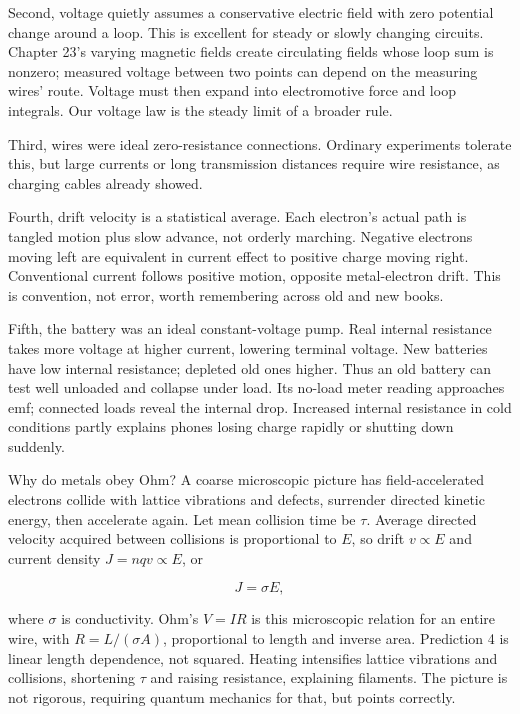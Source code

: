 Second, voltage quietly assumes a conservative electric field with zero potential change around a loop. This is excellent for steady or slowly changing circuits. Chapter 23's varying magnetic fields create circulating fields whose loop sum is nonzero; measured voltage between two points can depend on the measuring wires' route. Voltage must then expand into electromotive force and loop integrals. Our voltage law is the steady limit of a broader rule.

Third, wires were ideal zero-resistance connections. Ordinary experiments tolerate this, but large currents or long transmission distances require wire resistance, as charging cables already showed.

Fourth, drift velocity is a statistical average. Each electron's actual path is tangled motion plus slow advance, not orderly marching. Negative electrons moving left are equivalent in current effect to positive charge moving right. Conventional current follows positive motion, opposite metal-electron drift. This is convention, not error, worth remembering across old and new books.

Fifth, the battery was an ideal constant-voltage pump. Real internal resistance takes more voltage at higher current, lowering terminal voltage. New batteries have low internal resistance; depleted old ones higher. Thus an old battery can test well unloaded and collapse under load. Its no-load meter reading approaches emf; connected loads reveal the internal drop. Increased internal resistance in cold conditions partly explains phones losing charge rapidly or shutting down suddenly.

\begin{mathbridge}
Why do metals obey Ohm? A coarse microscopic picture has field-accelerated electrons collide with lattice vibrations and defects, surrender directed kinetic energy, then accelerate again. Let mean collision time be \(\tau\). Average directed velocity acquired between collisions is proportional to \(E\), so drift \(v\propto E\) and current density \(J=nqv\propto E\), or

\[
J=\sigma E,
\]

where \(\sigma\) is conductivity. Ohm's \(V=IR\) is this microscopic relation for an entire wire, with \(R=L/(\sigma A)\), proportional to length and inverse area. Prediction 4 is linear length dependence, not squared. Heating intensifies lattice vibrations and collisions, shortening \(\tau\) and raising resistance, explaining filaments. The picture is not rigorous, requiring quantum mechanics for that, but points correctly.
\end{mathbridge}

